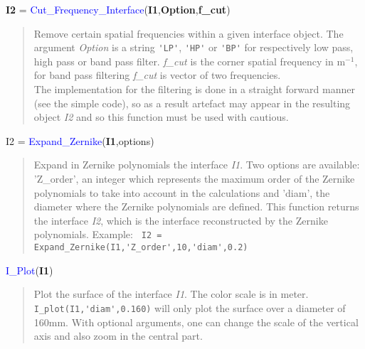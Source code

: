 \noindent \textbf{I2} = \textcolor{blue}{Cut\_Frequency\_Interface}(\textbf{I1},\textbf{Option},\textbf{f\_cut})
\vspace*{-0.2cm}
\begin{quote}
Remove certain spatial frequencies within a given interface object. The argument \textsl{Option} is a string \verb?'LP'?, \verb?'HP'? or \verb?'BP'? for respectively low pass, high pass or band pass filter. \textsl{f\_cut} is the corner spatial frequency in m$^{-1}$, for band pass filtering \textsl{f\_cut} is vector of two frequencies.\\
The implementation for the filtering is done in a straight forward manner (see the simple code), so as a result artefact may appear in the resulting object \textsl{I2} and so this function must be used with cautious.
\end{quote}


\noindent I2 = \textcolor{blue}{Expand\_Zernike}(\textbf{I1},options)
\vspace*{-0.2cm}
\begin{quote}
Expand in Zernike polynomials the interface \textsl{I1}. Two options are available: 'Z\_order', an integer which represents the maximum order of the Zernike polynomials to take into account in the calculations and 'diam', the diameter where the Zernike polynomials are defined. This function returns the interface \textsl{I2}, which is the interface reconstructed by the Zernike polynomials. Example:
\verb? I2 = Expand_Zernike(I1,'Z_order',10,'diam',0.2) ?
\end{quote}


\noindent \textcolor{blue}{I\_Plot}(\textbf{I1})
\vspace*{-0.2cm}
\begin{quote}
Plot the surface of the interface \textsl{I1}. The color scale is in meter. \verb? I_plot(I1,'diam',0.160)? will only plot the surface over a diameter of 160mm. With optional arguments, one can change the scale of the vertical axis and also zoom in the central part.
\end{quote}


